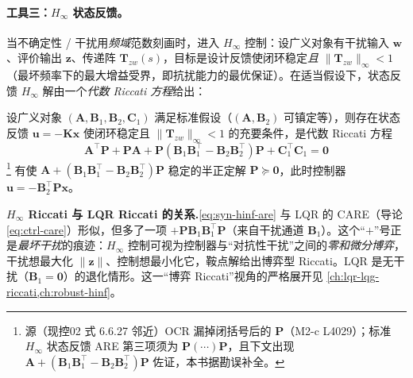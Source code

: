 \paragraph{工具三：$H_\infty$ 状态反馈。}
当不确定性 / 干扰用\emph{频域}范数刻画时，进入 $H_\infty$ 控制：设广义对象有干扰输入 $\mathbf w$、评价输出 $\mathbf z$、传递阵 $\mathbf T_{zw}(s)$，目标是设计反馈使闭环稳定\emph{且} $\|\mathbf T_{zw}\|_\infty<1$（最坏频率下的最大增益受界，即抗扰能力的最优保证）\cite{zhang2017modern}。在适当假设下，状态反馈 $H_\infty$ 解由一个\emph{代数 Riccati 方程}给出：

\begin{theorem}
\label{thm:syn-hinf}
设广义对象 $(\mathbf A,\mathbf B_1,\mathbf B_2,\mathbf C_1)$ 满足标准假设（$(\mathbf A,\mathbf B_2)$ 可镇定等），则存在状态反馈 $\mathbf u=-\mathbf K\mathbf x$ 使闭环稳定且 $\|\mathbf T_{zw}\|_\infty<1$ 的充要条件，是代数 Riccati 方程
\begin{equation}
  \mathbf A^\top\mathbf P+\mathbf P\mathbf A+\mathbf P(\mathbf B_1\mathbf B_1^\top-\mathbf B_2\mathbf B_2^\top)\mathbf P+\mathbf C_1^\top\mathbf C_1=\mathbf 0
  \label{eq:syn-hinf-are}
\end{equation}
\footnote{源（现控02 式 6.6.27 邻近）OCR 漏掉闭括号后的 $\mathbf P$（M2-c L4029）；标准 $H_\infty$ 状态反馈 ARE 第三项须为 $\mathbf P(\cdots)\mathbf P$，且下文出现 $\mathbf A+(\mathbf B_1\mathbf B_1^\top-\mathbf B_2\mathbf B_2^\top)\mathbf P$ 佐证，本书据勘误补全。}
有使 $\mathbf A+(\mathbf B_1\mathbf B_1^\top-\mathbf B_2\mathbf B_2^\top)\mathbf P$ 稳定的半正定解 $\mathbf P\succeq\mathbf 0$，此时控制器 $\mathbf u=-\mathbf B_2^\top\mathbf P\mathbf x$\cite{zhang2017modern}。
\end{theorem}

\begin{note}
\textbf{$H_\infty$ Riccati 与 LQR Riccati 的关系.}\;\cref{eq:syn-hinf-are} 与 LQR 的 CARE（导论 \cref{eq:ctrl-care}）形似，但多了一项 $+\mathbf P\mathbf B_1\mathbf B_1^\top\mathbf P$（来自干扰通道 $\mathbf B_1$）。这个“$+$”号正是\emph{最坏干扰}的痕迹：$H_\infty$ 控制可视为控制器与“对抗性干扰”之间的\emph{零和微分博弈}，干扰想最大化 $\|\mathbf z\|$、控制想最小化它，鞍点解给出博弈型 Riccati。LQR 是无干扰（$\mathbf B_1=\mathbf 0$）的退化情形。这一“博弈 Riccati”视角的严格展开见 \cref{ch:lqr-lqg-riccati,ch:robust-hinf}。
\end{note}

